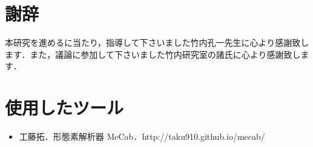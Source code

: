 \documentclass[10pt,uplatex,a4j]{jsarticle}
\begin{document}





\newpage
\setcounter{tocdepth}{3}
\tableofcontents
\newpage

\pagestyle{fancy}
\lhead{\leftmark}
\rhead{\thepage}
\lfoot{}
\cfoot{}
\renewcommand{\footrulewidth}{0.4pt}

\setcounter{page}{1}







\section*{謝辞}
本研究を進めるに当たり，指導して下さいました竹内孔一先生に心より感謝致します．また，議論に参加して下さいました竹内研究室の諸氏に心より感謝致します．

\section*{使用したツール}
\begin{itemize}
\item 工藤拓．形態素解析器 MeCab．http://taku910.github.io/mecab/
\end{itemize}


\nocite{*}




\end{document}
